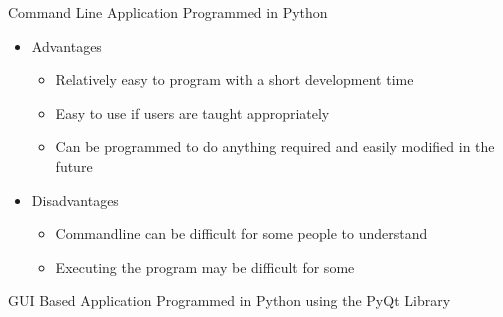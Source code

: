 Command Line Application Programmed in Python

\begin{itemize}
	\item Advantages
	\begin{itemize}
		\item Relatively easy to program with a short development time
		\item Easy to use if users are taught appropriately
		\item Can be programmed to do anything required and easily modified in the future
	\end{itemize}
	\item Disadvantages
	\begin{itemize}
		\item Commandline can be difficult for some people to understand 
		\item Executing the program may be difficult for some
	\end{itemize}
\end{itemize}

GUI Based Application Programmed in Python using the PyQt Library

